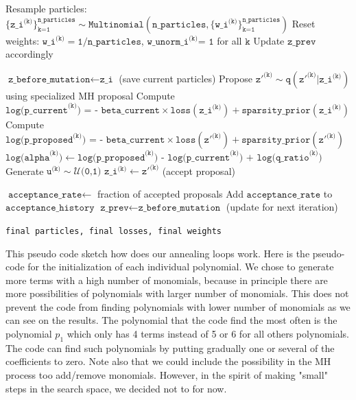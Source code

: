 \documentclass[11pt]{article}
\begin{document}
\begin{algorithm}
\begin{algorithmic}[1]
		 
		\State Resample particles: $\{\texttt{z\_i}^{\texttt{(k)}}\}_{\texttt{k=1}}^{\texttt{n\_particles}} \sim \texttt{Multinomial}(\texttt{n\_particles}, \{\texttt{w\_i}^{\texttt{(k)}}\}_{\texttt{k=1}}^{\texttt{n\_particles}})$
		\State Reset weights: $\texttt{w\_i}^{\texttt{(k)}} = \texttt{1/n\_particles}$, $\texttt{w\_unorm\_i}^{\texttt{(k)}} \texttt{= 1}$ for all $\texttt k$
		\State Update $\texttt{z\_prev}$ accordingly
		\EndIf
		
		\State $\texttt{z\_before\_mutation} \leftarrow \texttt{z\_i}$ (save current particles)
		 
		\State Propose $\texttt{z}'^{\texttt{(k)}} \sim \texttt{q}(\texttt{z}'^{\texttt{(k)}} | \texttt{z\_i}^{\texttt{(k)}})$ using specialized MH proposal
		\State Compute $ \texttt{log(p\_current}^{\texttt{(k)}} \texttt{) = - beta\_current} \times \texttt{loss}(\texttt{z\_i}^{\texttt{(k)}}) + \texttt{sparsity\_prior}(\texttt{z\_i}^{\texttt{(k)}})$
		\State Compute $\texttt{log(p\_proposed}^{\texttt{(k)}} \texttt{) = - beta\_current} \times \texttt{loss}(\texttt{z}'^{\texttt{(k)}}) + \texttt{sparsity\_prior}(\texttt{z}'^{\texttt{(k)}})$
		\State $\texttt{log(alpha}^{\texttt{(k)}} \texttt) \leftarrow  \texttt{log(p\_proposed}^{\texttt{(k)}}  \texttt{) -  log(p\_current}^{\texttt{(k)}}  \texttt{) + log(q\_ratio}^{\texttt{(k)}}\texttt)$
		\State Generate $\texttt{u}^{\texttt{(k)}} \sim \mathcal{U}\texttt{(0,1)}$
		\State $\texttt{z\_i}^{\texttt{(k)}} \leftarrow \texttt{z}'^{\texttt{(k)}}$ (accept proposal)
		\EndIf
		\EndFor
		
		\State $\texttt{acceptance\_rate} \leftarrow$ fraction of accepted proposals
		\State Add $\texttt{acceptance\_rate}$ to $\texttt{acceptance\_history}$
		\State $\texttt{z\_prev} \leftarrow \texttt{z\_before\_mutation}$ (update for next iteration)
		
		\EndFor
		
		\Return \texttt{final particles, final losses, final weights}
	\end{algorithmic}
\end{algorithm}

This pseudo code sketch how does our annealing loops work. Here is the pseudo-code for the initialization of each individual polynomial. We chose to generate more terms with a high number of monomials, because in principle there are more possibilities of polynomials with larger number of monomials. This does not prevent the code from finding polynomials with lower number of monomials as we can see on the results. The polynomial that the code find the most often is the polynomial $p_1$ which only has 4 terms instead of 5 or 6 for all others polynomials. The code can find such polynomials by putting gradually one or several of the coefficients to zero. Note also that we could include the possibility in the MH process too add/remove monomials. However, in the spirit of making "small" steps in the search space, we decided not to for now. 
\end{document}
